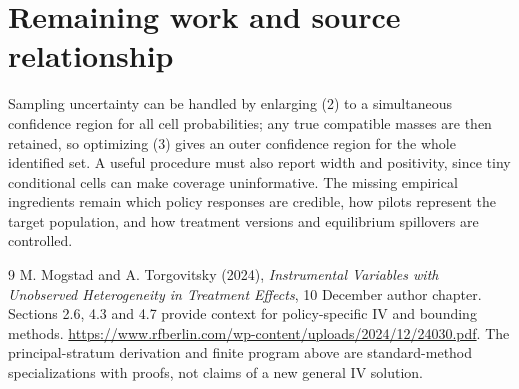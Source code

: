 \documentclass[11pt]{article}
\theoremstyle{definition}
\begin{document}
\section*{Remaining work and source relationship}
Sampling uncertainty can be handled by enlarging (2) to a simultaneous confidence
region for all cell probabilities; any true compatible masses are then retained,
so optimizing (3) gives an outer confidence region for the whole identified set.
A useful procedure must also report width and positivity, since tiny conditional
cells can make coverage uninformative. The missing empirical ingredients remain
which policy responses are credible, how pilots represent the target population,
and how treatment versions and equilibrium spillovers are controlled.
\begin{thebibliography}{9}
 M. Mogstad and A. Torgovitsky (2024),
\emph{Instrumental Variables with Unobserved Heterogeneity in Treatment Effects},
10 December author chapter. Sections 2.6, 4.3 and 4.7 provide context for
policy-specific IV and bounding methods.
\url{https://www.rfberlin.com/wp-content/uploads/2024/12/24030.pdf}.
The principal-stratum derivation and finite program above are standard-method
specializations with proofs, not claims of a new general IV solution.
\end{thebibliography}
\end{document}

